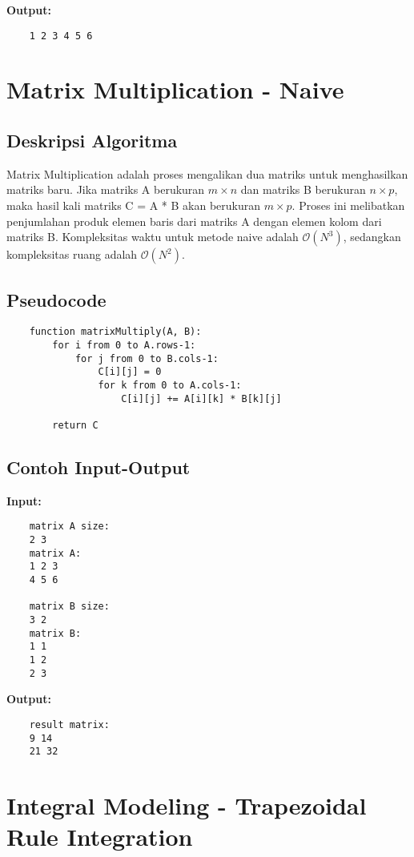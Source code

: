\textbf{Output:}
\begin{verbatim}
    1 2 3 4 5 6
\end{verbatim}

\section{Matrix Multiplication - Naive}
\label{sec:matrix-multiplication-implementation}

\subsection{Deskripsi Algoritma}
Matrix Multiplication adalah proses mengalikan dua matriks untuk menghasilkan matriks baru. Jika matriks A berukuran $m \times n$ dan matriks B berukuran $n \times p$, maka hasil kali matriks C = A * B akan berukuran $m \times p$. Proses ini melibatkan penjumlahan produk elemen baris dari matriks A dengan elemen kolom dari matriks B. Kompleksitas waktu untuk metode naive adalah $\mathcal{O}\left(N^3\right)$, sedangkan kompleksitas ruang adalah $\mathcal{O}\left(N^2\right)$.

\subsection{Pseudocode}
\begin{verbatim}
    function matrixMultiply(A, B):
        for i from 0 to A.rows-1:
            for j from 0 to B.cols-1:
                C[i][j] = 0
                for k from 0 to A.cols-1:
                    C[i][j] += A[i][k] * B[k][j]

        return C
\end{verbatim}

\subsection{Contoh Input-Output}
\textbf{Input:}
\begin{verbatim}
    matrix A size:
    2 3
    matrix A:
    1 2 3
    4 5 6

    matrix B size:
    3 2
    matrix B:
    1 1
    1 2
    2 3
\end{verbatim}

\textbf{Output:}
\begin{verbatim}
    result matrix:
    9 14
    21 32
\end{verbatim}

\section{Integral Modeling - Trapezoidal Rule Integration}
\label{sec:trapezoidal-rule-integration-implementation}

